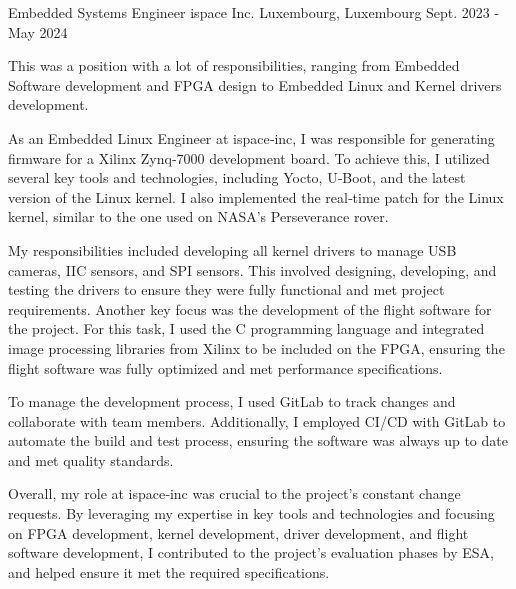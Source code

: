 \begin{cventries}
  \cventry
    {Embedded Systems Engineer} %
    {ispace Inc.} %
    {Luxembourg, Luxembourg} %
    {Sept. 2023 - May 2024} %
    {
        \begin{cvitems} %
            \item {This was a position with a lot of responsibilities, ranging from Embedded Software development and FPGA design to Embedded Linux and Kernel drivers development.}
            \item {As an Embedded Linux Engineer at ispace‑inc, I was responsible for generating firmware for a Xilinx Zynq‑7000 development board. To achieve this, I utilized several key tools and technologies, including Yocto, U‑Boot, and the latest version of the Linux kernel. I also implemented the real‑time patch for the Linux kernel, similar to the one used on NASA’s Perseverance rover.}
            \item {My responsibilities included developing all kernel drivers to manage USB cameras, IIC sensors, and SPI sensors. This involved designing, developing, and testing the drivers to ensure they were fully functional and met project requirements. Another key focus was the development of the flight software for the project. For this task, I used the C programming language and integrated image processing libraries from Xilinx to be included on the FPGA, ensuring the flight software was fully optimized and met performance specifications.}
            \item {To manage the development process, I used GitLab to track changes and collaborate with team members. Additionally, I employed CI/CD with GitLab to automate the build and test process, ensuring the software was always up to date and met quality standards.}
            \item {Overall, my role at ispace‑inc was crucial to the project’s constant change requests. By leveraging my expertise in key tools and technologies and focusing on FPGA development, kernel development, driver development, and flight software development, I contributed to the project’s evaluation phases by ESA, and helped ensure it met the required specifications.}
        \end{cvitems}
    }


\end{cventries}
